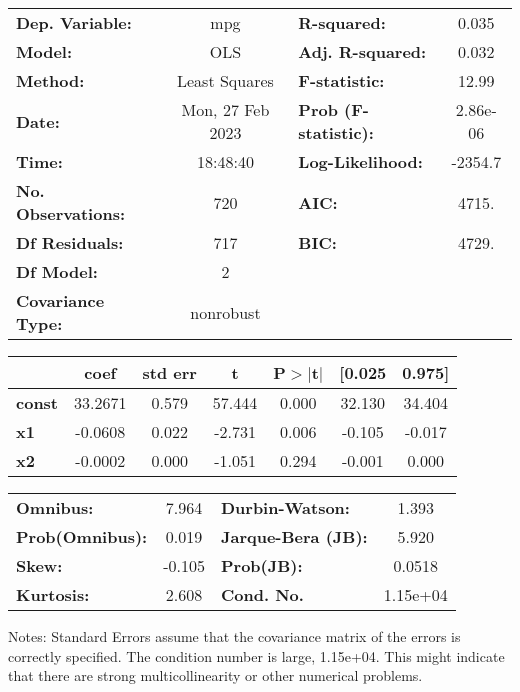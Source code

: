 \begin{center}
\begin{tabular}{lclc}
\toprule
\textbf{Dep. Variable:}    &       mpg        & \textbf{  R-squared:         } &     0.035   \\
\textbf{Model:}            &       OLS        & \textbf{  Adj. R-squared:    } &     0.032   \\
\textbf{Method:}           &  Least Squares   & \textbf{  F-statistic:       } &     12.99   \\
\textbf{Date:}             & Mon, 27 Feb 2023 & \textbf{  Prob (F-statistic):} &  2.86e-06   \\
\textbf{Time:}             &     18:48:40     & \textbf{  Log-Likelihood:    } &   -2354.7   \\
\textbf{No. Observations:} &         720      & \textbf{  AIC:               } &     4715.   \\
\textbf{Df Residuals:}     &         717      & \textbf{  BIC:               } &     4729.   \\
\textbf{Df Model:}         &           2      & \textbf{                     } &             \\
\textbf{Covariance Type:}  &    nonrobust     & \textbf{                     } &             \\
\bottomrule
\end{tabular}
\begin{tabular}{lcccccc}
               & \textbf{coef} & \textbf{std err} & \textbf{t} & \textbf{P$> |$t$|$} & \textbf{[0.025} & \textbf{0.975]}  \\
\midrule
\textbf{const} &      33.2671  &        0.579     &    57.444  &         0.000        &       32.130    &       34.404     \\
\textbf{x1}    &      -0.0608  &        0.022     &    -2.731  &         0.006        &       -0.105    &       -0.017     \\
\textbf{x2}    &      -0.0002  &        0.000     &    -1.051  &         0.294        &       -0.001    &        0.000     \\
\bottomrule
\end{tabular}
\begin{tabular}{lclc}
\textbf{Omnibus:}       &  7.964 & \textbf{  Durbin-Watson:     } &    1.393  \\
\textbf{Prob(Omnibus):} &  0.019 & \textbf{  Jarque-Bera (JB):  } &    5.920  \\
\textbf{Skew:}          & -0.105 & \textbf{  Prob(JB):          } &   0.0518  \\
\textbf{Kurtosis:}      &  2.608 & \textbf{  Cond. No.          } & 1.15e+04  \\
\bottomrule
\end{tabular}
\end{center}

Notes: \newline
 [1] Standard Errors assume that the covariance matrix of the errors is correctly specified. \newline
 [2] The condition number is large, 1.15e+04. This might indicate that there are \newline
 strong multicollinearity or other numerical problems.